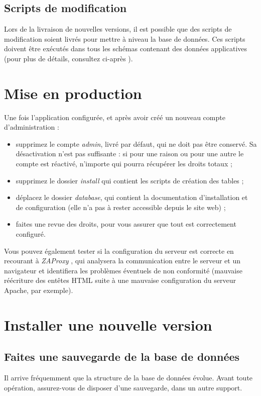 \subsection{Scripts de modification}

Lors de la livraison de nouvelles versions, il est possible que des scripts de modification soient livrés pour mettre à niveau la base de données. Ces scripts doivent être exécutés dans tous les schémas contenant des données applicatives (pour plus de détails, consultez ci-après \textit{}).

\section{Mise en production}

Une fois l'application configurée, et après avoir créé un nouveau compte d'administration :
\begin{itemize}
\item supprimez le compte \textit{admin}, livré par défaut, qui ne doit pas être conservé. Sa désactivation n'est pas suffisante : si pour une raison ou pour une autre le compte est réactivé, n'importe qui pourra récupérer les droits totaux ;
\item supprimez le dossier \textit{install} qui contient les scripts de création des tables ;
\item déplacez le dossier \textit{database}, qui contient la documentation d'installation et de configuration (elle n'a pas à rester accessible depuis le site web) ;
\item faites une revue des droits, pour vous assurer que tout est correctement configuré.
\end{itemize}

Vous pouvez également tester si la configuration du serveur est correcte en recourant à \textit{ZAProxy} \cite{zaproxy}, qui analysera la communication entre le serveur et un navigateur et identifiera les problèmes éventuels de non conformité (mauvaise réécriture des entêtes HTML suite à une mauvaise configuration du serveur Apache, par exemple).

\section{Installer une nouvelle version}
\label{newVersion}
\subsection{Faites une sauvegarde de la base de données}
Il arrive fréquemment que la structure de la base de données évolue. Avant toute opération, assurez-vous de disposer d'une sauvegarde, dans un autre support.

